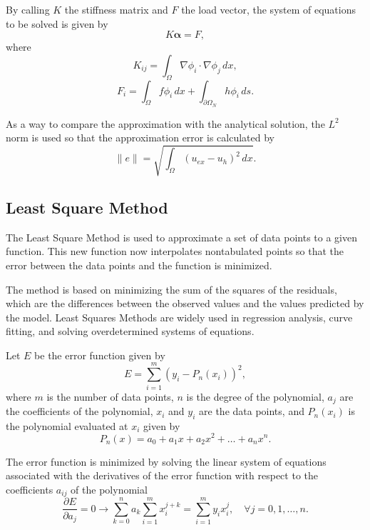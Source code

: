 By calling $K$ the stiffness matrix and $F$ the load vector, the system of equations to be solved is given by
\begin{equation}
    K\bm{\alpha} = F,
\end{equation}
where
\begin{equation}
    K_{ij} = \int_{\Omega} \nabla \phi_i \cdot \nabla \phi_j \, dx,
\end{equation}
\begin{equation}
    F_i = \int_{\Omega} f\phi_i \, dx + \int_{\partial \Omega_N} h\phi_i \, ds.
\end{equation}



As a way to compare the approximation with the analytical solution, the $L^2$ norm is used so that the approximation error is calculated by 
\begin{equation}
    \|e\| = \sqrt{\int_{\Omega} (u_{ex} - u_h)^2 \, dx}.
\end{equation}

\subsection{Least Square Method}\label{subsec:least_squares_method}
The Least Square Method is used to approximate a set of data points to a given function. This new function now interpolates nontabulated points so that the error between the data points and the function is minimized. 

The method is based on minimizing the sum of the squares of the residuals, which are the differences between the observed values and the values predicted by the model. Least Squares Methods are widely used in regression analysis, curve fitting, and solving overdetermined systems of equations.

Let $E$ be the error function given by 
\begin{equation}
    E = \sum_{i=1}^{m} (y_i - P_n(x_i))^2,
\end{equation}
where $m$ is the number of data points, $n$ is the degree of the polynomial, $a_j$ are the coefficients of the polynomial, $x_i$ and $y_i$ are the data points, and $P_n(x_i)$ is the polynomial evaluated at $x_i$ given by 
\begin{equation}
    P_n(x) = a_0 + a_1x + a_2x^2 + \ldots + a_nx^n.
\end{equation} 

The error function is minimized by solving the linear system of equations associated with the derivatives of the error function with respect to the coefficients $a_{ij}$ of the polynomial
\begin{equation}
    \frac{\partial E}{\partial a_j} = 0 \rightarrow \sum_{k=0}^n a_k \sum_{i=1}^m x_i^{j+k} = \sum_{i=1}^m y_i x_i^j, \quad \forall j = 0,1,\ldots,n.
    \label{eq:partial_error}
\end{equation}

